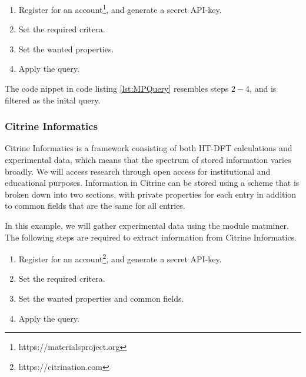 \begin{enumerate}
  \item Register for an account\footnote{https://materialsproject.org}, and generate a secret API-key.
  \item Set the required critera.
  \item Set the wanted properties.
  \item Apply the query.
\end{enumerate}

The code nippet in code listing \autoref{lst:MPQuery} resembles steps $2-4$, and is filtered as the inital query. %

\subsubsection{Citrine Informatics}

Citrine Informatics is a framework consisting of both HT-DFT calculations and experimental data, which means that the spectrum of stored information varies broadly. We will access research through open access for institutional and educational purposes. Information in Citrine can be stored using a scheme that is broken down into two sections, with private properties for each entry in addition to common fields that are the same for all entries.%

In this example, we will gather experimental data using the module matminer. The following steps are required to extract information from Citrine Informatics.

\begin{enumerate}
  \item Register for an account\footnote{https://citrination.com}, and generate a secret API-key.
  \item Set the required critera.
  \item Set the wanted properties and common fields.
  \item Apply the query.
\end{enumerate}

